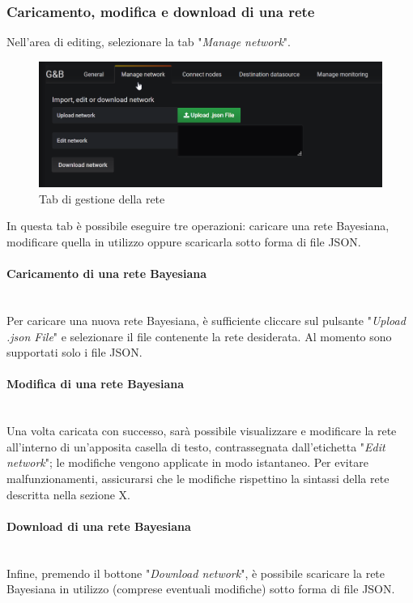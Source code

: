 \subsubsection{Caricamento, modifica e download di una rete}
Nell'area di editing, selezionare la tab "\textit{Manage network}".
\begin{figure} [H]
	\centering
	\includegraphics[scale=0.55]{Img/managenet} 
	\caption{Tab di gestione della rete} \label{} 
\end{figure} 
In questa tab è possibile eseguire tre operazioni: caricare una rete Bayesiana, modificare quella in utilizzo oppure scaricarla sotto forma di file JSON.
\paragraph{Caricamento di una rete Bayesiana}~\\
	Per caricare una nuova rete Bayesiana, è sufficiente cliccare sul pulsante "\textit{Upload .json File}" e selezionare il file contenente la rete desiderata. Al momento sono supportati solo i file JSON.
\paragraph{Modifica di una rete Bayesiana}~\\
	Una volta caricata con successo, sarà possibile visualizzare e modificare la rete all'interno di un'apposita casella di testo, contrassegnata dall'etichetta "\textit{Edit network}"; le modifiche vengono applicate in modo istantaneo. Per evitare malfunzionamenti, assicurarsi che le modifiche rispettino la sintassi della rete descritta nella sezione X.
\paragraph{Download di una rete Bayesiana}~\\
	Infine, premendo il bottone "\textit{Download network}", è possibile scaricare la rete Bayesiana in utilizzo (comprese eventuali modifiche) sotto forma di file JSON.